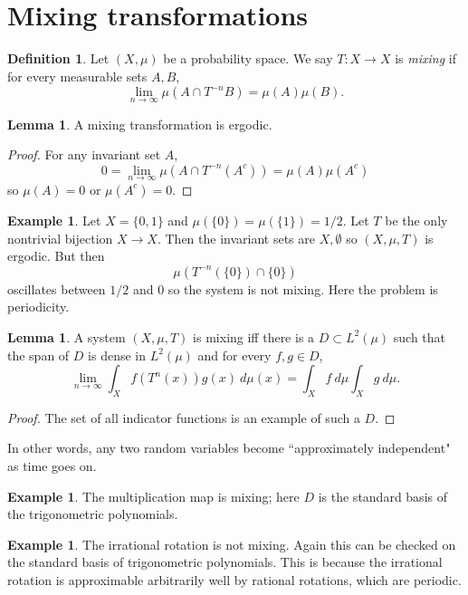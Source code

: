 \documentclass[12pt]{report}
\newcommand{\dfn}[1]{\emph{#1}\index{#1}}
\theoremstyle{definition}
\newtheorem{lemma}[theorem]{Lemma}
\newtheorem{definition}[theorem]{Definition}
\newtheorem{example}[theorem]{Example}
\begin{document}
\section{Mixing transformations}
\begin{definition}
Let $(X, \mu)$ be a probability space. We say $T: X \to X$ is \dfn{mixing} if for every measurable sets $A, B$,
$$\lim_{n \to \infty} \mu(A \cap T^{-n}B) = \mu(A)\mu(B).$$
\end{definition}
\begin{lemma}
A mixing transformation is ergodic.
\end{lemma}
\begin{proof}
For any invariant set $A$,
$$0 = \lim_{n \to \infty} \mu(A \cap T^{-n}(A^c)) = \mu(A)\mu(A^c)$$
so $\mu(A) = 0$ or $\mu(A^c) = 0$.
\end{proof}
\begin{example}
Let $X = \{0, 1\}$ and $\mu(\{0\}) = \mu(\{1\}) = 1/2$. Let $T$ be the only nontrivial bijection $X \to X$. Then the invariant sets are $X,\emptyset$ so $(X, \mu, T)$ is ergodic. But then
$$\mu(T^{-n}(\{0\}) \cap \{0\})$$
oscillates between $1/2$ and $0$ so the system is not mixing. Here the problem is periodicity.
\end{example}
\begin{lemma}
A system $(X, \mu, T)$ is mixing iff there is a $D \subset L^2(\mu)$ such that the span of $D$ is dense in $L^2(\mu)$ and for every $f, g\in D$,
$$\lim_{n \to \infty} \int_X f(T^n(x))g(x) ~d\mu(x) = \int_X f~d\mu \int_X g~d\mu.$$
\end{lemma}
\begin{proof}
The set of all indicator functions is an example of such a $D$.
\end{proof}
In other words, any two random variables become ``approximately independent" as time goes on.
\begin{example}
The multiplication map is mixing; here $D$ is the standard basis of the trigonometric polynomials.
\end{example}
\begin{example}
The irrational rotation is not mixing. Again this can be checked on the standard basis of trigonometric polynomials. This is because the irrational rotation is approximable arbitrarily well by rational rotations, which are periodic.
\end{example}
\end{document}
